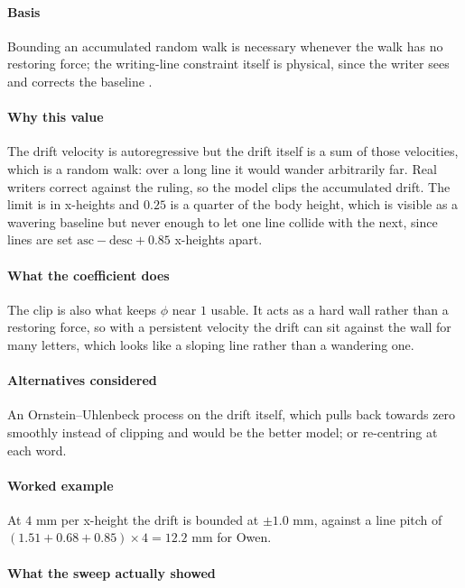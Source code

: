 \paragraph{Basis}

Bounding an accumulated random walk is necessary whenever the walk has no restoring force; the writing-line constraint itself is physical, since the writer sees and corrects the baseline \cite{plamondon2000}.

\paragraph{Why this value}

The drift velocity is autoregressive but the drift itself is a sum of those velocities, which is a random walk: over a long line it would wander arbitrarily far. Real writers correct against the ruling, so the model clips the accumulated drift. The limit is in x-heights and $0.25$ is a quarter of the body height, which is visible as a wavering baseline but never enough to let one line collide with the next, since lines are set $\text{asc}-\text{desc}+0.85$ x-heights apart.

\paragraph{What the coefficient does}

The clip is also what keeps $\phi$ near $1$ usable. It acts as a hard wall rather than a restoring force, so with a persistent velocity the drift can sit against the wall for many letters, which looks like a sloping line rather than a wandering one.

\paragraph{Alternatives considered}

An Ornstein--Uhlenbeck process on the drift itself, which pulls back towards zero smoothly instead of clipping and would be the better model; or re-centring at each word.

\paragraph{Worked example}

At $4$ mm per x-height the drift is bounded at $\pm 1.0$ mm, against a line pitch of $(1.51+0.68+0.85) \times 4 = 12.2$ mm for Owen.

\paragraph{What the sweep actually showed}

